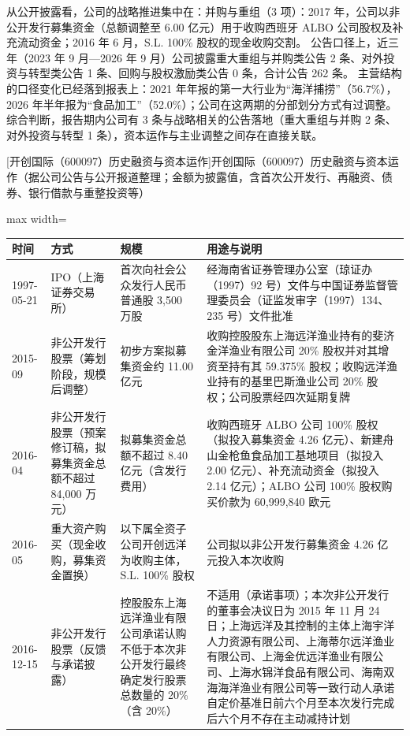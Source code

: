  从公开披露看，公司的战略推进集中在：并购与重组（3 项）：2017 年，公司以非公开发行募集资金（总额调整至 6.00 亿元）用于收购西班牙 ALBO 公司股权及补充流动资金；2016 年 6 月，S.L. 100\% 股权的现金收购交割。 公告口径上，近三年（2023 年 9 月---2026 年 9 月）公司披露重大重组与并购类公告 2 条、对外投资与转型类公告 1 条、回购与股权激励类公告 0 条，合计公告 262 条。 主营结构的口径变化已经落到报表上：2021 年年报的第一大行业为“海洋捕捞”（56.7\%），2026 年半年报为“食品加工”（52.0\%）；公司在这两期的分部划分方式有过调整。 综合判断，报告期内公司有 3 条与战略相关的公告落地（重大重组与并购 2 条、对外投资与转型 1 条），资本运作与主业调整之间存在直接关联。

\begin{center}\small\setlength{\tabcolsep}{4pt}
[开创国际（600097）历史融资与资本运作]{开创国际（600097）历史融资与资本运作（据公司公告与公开报道整理；金额为披露值，含首次公开发行、再融资、债券、银行借款与重整投资等）}
\begin{adjustbox}{max width=\textwidth}
\begin{tabular}{@{}p{1.45cm}p{2.55cm}p{4.05cm}p{4.95cm}@{}}
\toprule
时间 & 方式 & 规模 & 用途与说明 \\
\midrule
1997-05-21 & IPO（上海证券交易所） & 首次向社会公众发行人民币普通股 3,\allowbreak{}500 万股 & 经海南省证券管理办公室（琼证办（1997）92 号）文件与中国证券监督管理委员会（证监发审字（1997）134、\allowbreak{}235 号）文件批准 \\
2015-09 & 非公开发行股票（筹划阶段，规模后调整） & 初步方案拟募集资金约 11.00 亿元 & 收购控股股东上海远洋渔业持有的斐济金洋渔业有限公司 20\% 股权并对其增资至持有其 59.375\% 股权；收购远洋渔业持有的基里巴斯渔业公司 20\% 股权；公司股票经四次延期复牌 \\
2016-04 & 非公开发行股票（预案修订稿，拟募集资金总额不超过 84,000 万元） & 拟募集资金总额不超过 8.40 亿元（含发行费用） & 收购西班牙 ALBO 公司 100\% 股权（拟投入募集资金 4.26 亿元）、\allowbreak{}新建舟山金枪鱼食品加工基地项目（拟投入 2.00 亿元）、\allowbreak{}补充流动资金（拟投入 2.14 亿元）；ALBO 公司 100\% 股权购买价款为 60,\allowbreak{}999,\allowbreak{}840 欧元 \\
2016-05 & 重大资产购买（现金收购，募集资金置换） & 以下属全资子公司开创远洋为收购主体，\allowbreak{}S.L. 100\% 股权 & 公司拟以非公开发行募集资金 4.26 亿元投入本次收购 \\
2016-12-15 & 非公开发行股票（反馈与承诺披露） & 控股股东上海远洋渔业有限公司承诺认购不低于本次非公开发行最终确定发行股票总数量的 20\%（含 20\%） & 不适用（承诺事项）；本次非公开发行的董事会决议日为 2015 年 11 月 24 日；上海远洋及其控制的主体上海宇洋人力资源有限公司、\allowbreak{}上海蒂尔远洋渔业有限公司、\allowbreak{}上海金优远洋渔业有限公司、\allowbreak{}上海水锦洋食品有限公司、\allowbreak{}海南双海海洋渔业有限公司等一致行动人承诺自定价基准日前六个月至本次发行完成后六个月不存在主动减持计划 \\

\end{tabular}
\end{adjustbox}
\end{center}
